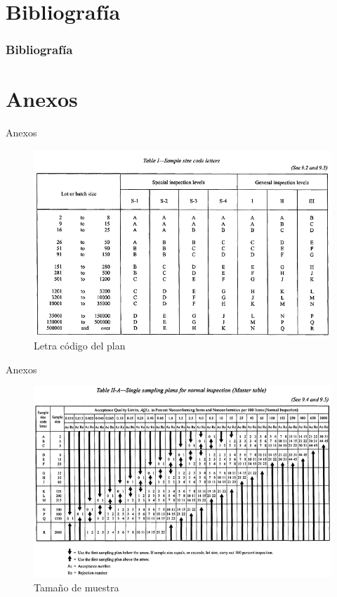 \documentclass[10pt]{beamer}
\begin{document}
\section{Bibliografía}
\begin{frame}
  \frametitle{Bibliografía}
  
\nocite{A0,ControlR}
  
  
  
\end{frame}

\section{Anexos}
\begin{frame}{Anexos}
\begin{figure}[h!]
  \centering
  \includegraphics[scale=0.55]{FigurasUV/letra.png}
  \caption{Letra código del plan}
\end{figure}
\end{frame}

\begin{frame}{Anexos}
\begin{figure}[h!]
  \centering
  \includegraphics[scale=0.6]{FigurasUV/n.png}
  \caption{Tamaño de muestra}
\end{figure}
\end{frame}
\end{document}
